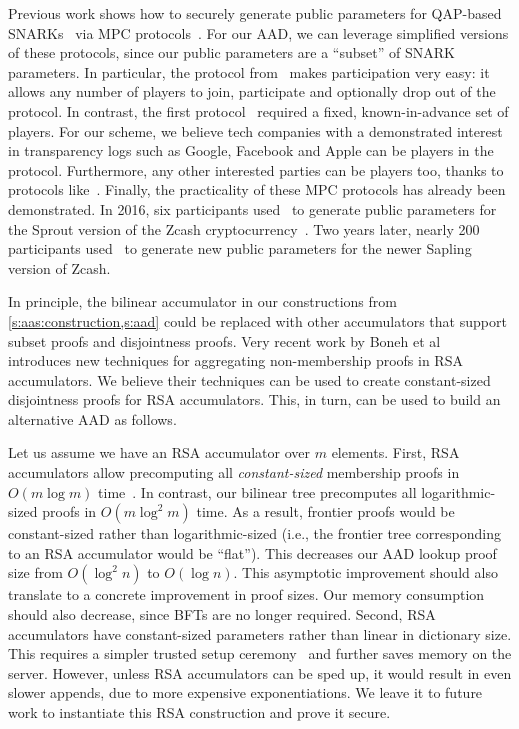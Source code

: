 Previous work shows how to securely generate public parameters for QAP-based SNARKs~\cite{groth10,groth16} via MPC protocols~\cite{zcash-mpc1,zcash-mpc2}.
For our AAD, we can leverage simplified versions of these protocols, since our public parameters are a ``subset'' of SNARK parameters.
In particular, the protocol from~\cite{zcash-mpc2} makes participation very easy: it allows any number of players to join, participate and optionally drop out of the protocol.
In contrast, the first protocol~\cite{zcash-mpc1} required a fixed, known-in-advance set of players.
For our scheme, we believe tech companies with a demonstrated interest in transparency logs such as Google, Facebook and Apple can be players in the protocol.
Furthermore, any other interested parties can be players too, thanks to protocols like~\cite{zcash-mpc2}.
Finally, the practicality of these MPC protocols has already been demonstrated.
In 2016, six participants used~\cite{zcash-mpc1} to generate public parameters for the Sprout version of the Zcash cryptocurrency~\cite{zcash}.
Two years later, nearly 200 participants used~\cite{zcash-mpc2} to generate new public parameters for the newer Sapling version of Zcash.

In principle, the bilinear accumulator in our constructions from \cref{s:aas:construction,s:aad} could be replaced with other accumulators that support subset proofs and disjointness proofs.
Very recent work by Boneh et al~\cite{batch-rsa-acc} introduces new techniques for aggregating non-membership proofs in RSA accumulators.
We believe their techniques can be used to create constant-sized disjointness proofs for RSA accumulators.
This, in turn, can be used to build an alternative AAD as follows.

Let us assume we have an RSA accumulator over $m$ elements.
First, RSA accumulators allow precomputing all \textit{constant-sized} membership proofs in $O(m\log{m})$ time~\cite{blind-auditable-memb-proofs}.
In contrast, our bilinear tree precomputes all logarithmic-sized proofs in $O(m\log^2{m})$ time.
As a result, frontier proofs would be constant-sized rather than logarithmic-sized (i.e., the frontier tree corresponding to an RSA accumulator would be ``flat'').
This decreases our AAD lookup proof size from $O(\log^2{n})$ to $O(\log{n})$.
This asymptotic improvement should also translate to a concrete improvement in proof sizes.
Our memory consumption should also decrease, since BFTs are no longer required.
Second, RSA accumulators have constant-sized parameters rather than linear in dictionary size.
This requires a simpler trusted setup ceremony~\cite{Frederiksen2018} and further saves memory on the server.
However, unless RSA accumulators can be sped up, it would result in even slower appends, due to more expensive exponentiations.
We leave it to future work to instantiate this RSA construction and prove it secure.


